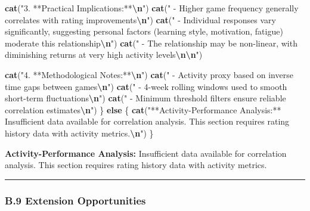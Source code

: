 \documentclass[
]{article}
\newenvironment{Shaded}{\begin{snugshade}}{\end{snugshade}}
\newcommand{\ControlFlowTok}[1]{\textcolor[rgb]{0.13,0.29,0.53}{\textbf{#1}}}
\newcommand{\FunctionTok}[1]{\textcolor[rgb]{0.13,0.29,0.53}{\textbf{#1}}}
\newcommand{\NormalTok}[1]{#1}
\newcommand{\SpecialCharTok}[1]{\textcolor[rgb]{0.81,0.36,0.00}{\textbf{#1}}}
\newcommand{\StringTok}[1]{\textcolor[rgb]{0.31,0.60,0.02}{#1}}
\begin{document}
\begin{Shaded}
\begin{Highlighting}[]
    \FunctionTok{cat}\NormalTok{(}\StringTok{"3. **Practical Implications:**}\SpecialCharTok{\textbackslash{}n}\StringTok{"}\NormalTok{)}
    \FunctionTok{cat}\NormalTok{(}\StringTok{"   {-} Higher game frequency generally correlates with rating improvements}\SpecialCharTok{\textbackslash{}n}\StringTok{"}\NormalTok{)}
    \FunctionTok{cat}\NormalTok{(}\StringTok{"   {-} Individual responses vary significantly, suggesting personal factors (learning style, motivation, fatigue) moderate this relationship}\SpecialCharTok{\textbackslash{}n}\StringTok{"}\NormalTok{)}
    \FunctionTok{cat}\NormalTok{(}\StringTok{"   {-} The relationship may be non{-}linear, with diminishing returns at very high activity levels}\SpecialCharTok{\textbackslash{}n\textbackslash{}n}\StringTok{"}\NormalTok{)}

    \FunctionTok{cat}\NormalTok{(}\StringTok{"4. **Methodological Notes:**}\SpecialCharTok{\textbackslash{}n}\StringTok{"}\NormalTok{)}
    \FunctionTok{cat}\NormalTok{(}\StringTok{"   {-} Activity proxy based on inverse time gaps between games}\SpecialCharTok{\textbackslash{}n}\StringTok{"}\NormalTok{)}
    \FunctionTok{cat}\NormalTok{(}\StringTok{"   {-} 4{-}week rolling windows used to smooth short{-}term fluctuations}\SpecialCharTok{\textbackslash{}n}\StringTok{"}\NormalTok{)}
    \FunctionTok{cat}\NormalTok{(}\StringTok{"   {-} Minimum threshold filters ensure reliable correlation estimates}\SpecialCharTok{\textbackslash{}n}\StringTok{"}\NormalTok{)}
\NormalTok{\} }\ControlFlowTok{else}\NormalTok{ \{}
    \FunctionTok{cat}\NormalTok{(}\StringTok{"**Activity{-}Performance Analysis:** Insufficient data available for correlation analysis. This section requires rating history data with activity metrics.}\SpecialCharTok{\textbackslash{}n}\StringTok{"}\NormalTok{)}
\NormalTok{\}}
\end{Highlighting}
\end{Shaded}

\textbf{Activity-Performance Analysis:} Insufficient data available for
correlation analysis. This section requires rating history data with
activity metrics.

\begin{center}\rule{0.5\linewidth}{0.5pt}\end{center}

\subsubsection{B.9 Extension
Opportunities}\label{b.9-extension-opportunities}
\end{document}
